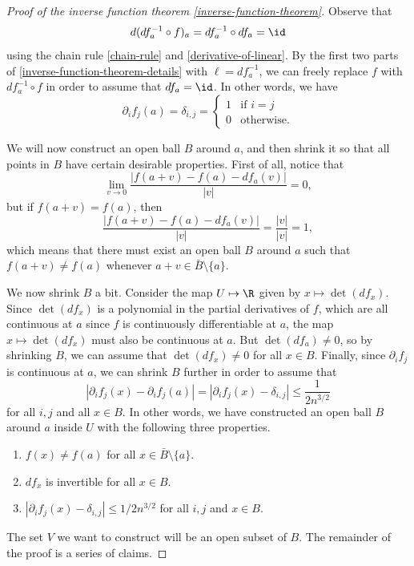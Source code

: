 \begin{proof}[Proof of the inverse function theorem \ref{inverse-function-theorem}]
	Observe that 
	\[ d(df_a^{-1} \circ f)_a = df_a^{-1} \circ df_a = \id \]
	using the chain rule \ref{chain-rule} and \cref{derivative-of-linear}. By the first two parts of  \cref{inverse-function-theorem-details} with $\ell = df_a^{-1}$, we can freely replace $f$ with $df_a^{-1} \circ f$ in order to assume that $df_a = \id$. In other words, we have
	\[ \partial_i f_j (a) = \delta_{i,j} = \begin{cases} 1 & \text{if } i = j \\ 0 & \text{otherwise}. \end{cases} \]
	
	We will now construct an open ball $B$ around $a$, and then shrink it so that all points in $B$ have certain desirable properties. First of all, notice that
	\[ \lim_{v \to 0} \frac{|f(a+v)-f(a)-df_a(v)|}{|v|} = 0, \]
	but if $f(a + v) = f(a)$, then 
	\[ \frac{|f(a+v) - f(a) - df_a(v)|}{|v|} = \frac{|v|}{|v|} = 1, \]
	which means that there must exist an open ball $B$ around $a$ such that $f(a+v) \neq f(a)$ whenever $a+v \in \bar{B} \setminus \{a\}$. 
	
	We now shrink $B$ a bit. Consider the map $U \mapsto \R$ given by $x \mapsto \det(df_x)$. Since $\det(df_x)$ is a polynomial in the partial derivatives of $f$, which are all continuous at $a$ since $f$ is continuously differentiable at $a$, the map $x \mapsto \det(df_x)$ must also be continuous at $a$. But $\det(df_a) \neq 0$, so by shrinking $B$, we can assume that $\det(df_x) \neq 0$ for all $x \in B$. Finally, since $\partial_i f_j$ is continuous at $a$, we can shrink $B$ further in order to assume that 
	\[ |\partial_i f_j (x) - \partial_i f_j(a)| = |\partial_i f_j(x) - \delta_{i,j}| \leq \frac{1}{2n^{3/2}} \]
	for all $i,j$ and all $x \in B$. In other words, we have constructed an open ball $B$ around $a$ inside $U$ with the following three properties. 
	\begin{enumerate}[(1)]
		\item $f(x) \neq f(a)$ for all $x \in \bar{B} \setminus \{a\}$. 
		\item $df_x$ is invertible for all $x \in B$. 
		\item $|\partial_i f_j(x) - \delta_{i,j}| \leq 1/2n^{3/2}$ for all $i, j$ and $x \in B$. 
	\end{enumerate}
	The set $V$ we want to construct will be an open subset of $B$. The remainder of the proof is a series of claims.  
	

\end{proof}
